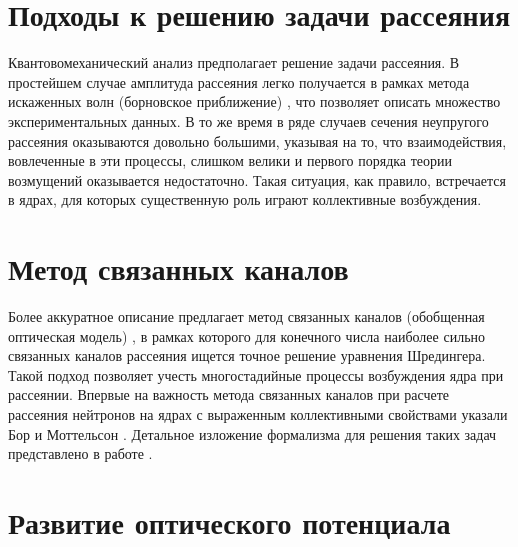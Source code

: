 \section{Подходы к решению задачи рассеяния}

Квантовомеханический анализ предполагает решение задачи рассеяния. В простейшем случае амплитуда рассеяния легко получается в рамках метода искаженных волн (борновское приближение) \cite{DavydovBookKM}, что позволяет описать множество экспериментальных данных. В то же время в ряде случаев сечения неупругого рассеяния оказываются довольно большими, указывая на то, что взаимодействия, вовлеченные в эти процессы, слишком велики и первого порядка теории возмущений оказывается недостаточно. Такая ситуация, как правило, встречается в ядрах, для которых существенную роль играют коллективные возбуждения.

\section{Метод связанных каналов}

Более аккуратное описание предлагает метод связанных каналов (обобщенная оптическая модель) \cite{Buck1963}, в рамках которого для конечного числа наиболее сильно связанных каналов рассеяния ищется точное решение уравнения Шредингера. Такой подход позволяет учесть многостадийные процессы возбуждения ядра при рассеянии. Впервые на важность метода связанных каналов при расчете рассеяния нейтронов на ядрах с выраженным коллективными свойствами указали Бор и Моттельсон \cite{Bohr1953}. Детальное изложение формализма для решения таких задач представлено в работе \cite{Tamura1965}.

\section{Развитие оптического потенциала}

